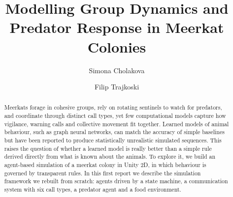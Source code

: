 \documentclass[9pt,twoside]{pnas-new}
\begin{document}
\title{Modelling Group Dynamics and Predator Response in Meerkat Colonies}

\author[1]{Simona Cholakova}
\author[1]{Filip Trajkoski}






\begin{abstract}
Meerkats forage in cohesive groups, rely on rotating sentinels to watch for predators, and coordinate through distinct call types, yet few computational models capture how vigilance, warning calls and collective movement fit together. Learned models of animal behaviour, such as graph neural networks, can match the accuracy of simple baselines but have been reported to produce statistically unrealistic simulated sequences. This raises the question of whether a learned model is really better than a simple rule derived directly from what is known about the animals. To explore it, we build an agent-based simulation of a meerkat colony in Unity 2D, in which behaviour is governed by transparent rules. In this first report we describe the simulation framework we rebuilt from scratch: agents driven by a state machine, a communication system with six call types, a predator agent and a food environment.
\end{abstract}
\end{document}
